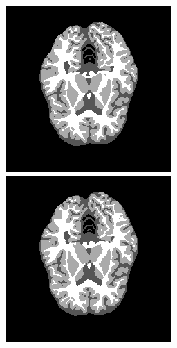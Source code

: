 \documentclass[runningheads,a4paper]{llncs}
\begin{document}
\begin{figure}
 \centering
 \begin{minipage}{.24\textwidth}
 \includegraphics[width=.98\linewidth]{./images/lstmfeas_new_new.png}
 \end{minipage}
  \begin{minipage}{.24\textwidth}
 \includegraphics[width=.98\linewidth]{./images/grusfeas_new_new.png}

\end{minipage}
\end{figure}
\end{document}
